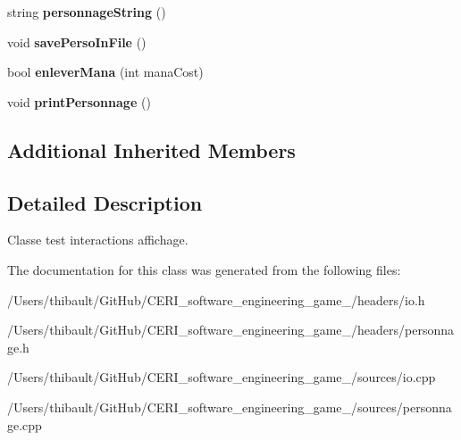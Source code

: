 \begin{DoxyCompactItemize}
\item 
\mbox{\label{classpersonnage_a46466382ea2e07059c97c4714a56ed30}} 
string {\bfseries personnage\+String} ()
\item 
\mbox{\label{classpersonnage_a50d0149c0f5d1aaa7375646c3bb2ab2b}} 
void {\bfseries save\+Perso\+In\+File} ()
\item 
\mbox{\label{classpersonnage_a0cb9b3d7d2c2decae742de8086f28766}} 
bool {\bfseries enlever\+Mana} (int mana\+Cost)
\item 
\mbox{\label{classpersonnage_a173f1b07d9098a96fd189ede2e7dad59}} 
void {\bfseries print\+Personnage} ()
\end{DoxyCompactItemize}
\subsection*{Additional Inherited Members}


\subsection{Detailed Description}
Classe test interactions affichage. 

The documentation for this class was generated from the following files\+:\begin{DoxyCompactItemize}
\item 
/\+Users/thibault/\+Git\+Hub/\+C\+E\+R\+I\+\_\+software\+\_\+engineering\+\_\+game\+\_/headers/io.\+h\item 
/\+Users/thibault/\+Git\+Hub/\+C\+E\+R\+I\+\_\+software\+\_\+engineering\+\_\+game\+\_/headers/personnage.\+h\item 
/\+Users/thibault/\+Git\+Hub/\+C\+E\+R\+I\+\_\+software\+\_\+engineering\+\_\+game\+\_/sources/io.\+cpp\item 
/\+Users/thibault/\+Git\+Hub/\+C\+E\+R\+I\+\_\+software\+\_\+engineering\+\_\+game\+\_/sources/personnage.\+cpp\end{DoxyCompactItemize}
